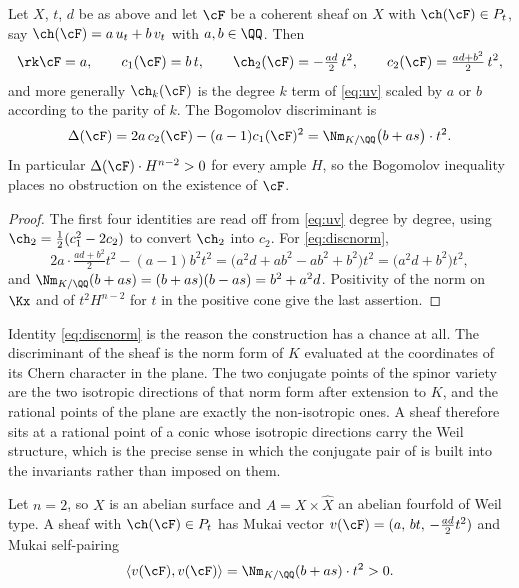 \begin{theorem}\label{thm:secantinvariants}
Let $X$, $t$, $d$ be as above and let $\cF$ be a coherent sheaf on $X$ with
$\ch(\cF)\in P_{t}$, say $\ch(\cF)=a\,u_{t}+b\,v_{t}$ with $a,b\in\QQ$. Then
\[
  \rk\cF=a,\qquad
  c_{1}(\cF)=b\,t,\qquad
  \ch_{2}(\cF)=-\tfrac{ad}{2}\,t^{2},\qquad
  c_{2}(\cF)=\tfrac{ad+b^{2}}{2}\,t^{2},
\]
and more generally $\ch_{k}(\cF)$ is the degree $k$ term of \eqref{eq:uv}
scaled by $a$ or $b$ according to the parity of $k$. The Bogomolov
discriminant is
\begin{equation}\label{eq:discnorm}
  \Delta(\cF)=2a\,c_{2}(\cF)-(a-1)c_{1}(\cF)^{2}
  =\Nm_{K/\QQ}\bigl(b+a s\bigr)\cdot t^{2}.
\end{equation}
In particular $\Delta(\cF)\cdot H^{n-2}>0$ for every ample $H$, so the
Bogomolov inequality places no obstruction on the existence of $\cF$.
\end{theorem}

\begin{proof}
The first four identities are read off from \eqref{eq:uv} degree by degree,
using $\ch_{2}=\tfrac12(c_{1}^{2}-2c_{2})$ to convert $\ch_{2}$ into $c_{2}$.
For \eqref{eq:discnorm},
\[
  2a\cdot\tfrac{ad+b^{2}}{2}t^{2}-(a-1)b^{2}t^{2}
  =\bigl(a^{2}d+ab^{2}-ab^{2}+b^{2}\bigr)t^{2}
  =\bigl(a^{2}d+b^{2}\bigr)t^{2},
\]
and $\Nm_{K/\QQ}(b+as)=(b+as)(b-as)=b^{2}+a^{2}d$. Positivity of the norm on
$\Kx$ and of $t^{2}H^{n-2}$ for $t$ in the positive cone give the last
assertion.
\end{proof}

\begin{remark}\label{rem:normdisc}
Identity \eqref{eq:discnorm} is the reason the construction has a chance at
all. The discriminant of the sheaf is the norm form of $K$ evaluated at the
coordinates of its Chern character in the plane. The two conjugate points of
the spinor variety are the two isotropic directions of that norm form after
extension to $K$, and the rational points of the plane are exactly the
non-isotropic ones. A sheaf therefore sits at a rational point of a conic
whose isotropic directions carry the Weil structure, which is the precise
sense in which the conjugate pair of  is built into
the invariants rather than imposed on them.
\end{remark}

\begin{corollary}\label{cor:surfacecase}
Let $n=2$, so $X$ is an abelian surface and $A=X\times\widehat{X}$ an abelian
fourfold of Weil type. A sheaf with $\ch(\cF)\in P_{t}$ has Mukai vector
$v(\cF)=(a,\,bt,\,-\tfrac{ad}{2}t^{2})$ and Mukai self-pairing
\[
  \langle v(\cF),v(\cF)\rangle=\Nm_{K/\QQ}(b+as)\cdot t^{2}>0 .
\]
\end{corollary}

